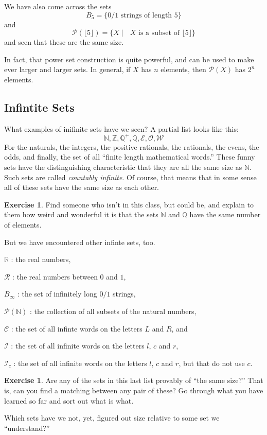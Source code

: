 \documentclass[12pt,letterpaper]{article}
\theoremstyle{definition}
\newtheorem{exercise}[question]{Exercise}
\begin{document}
We have also come across the sets
\[
B_5 = \{ \text{$0/1$ strings of length $5$} \}
\]
and 
\[
\mathcal{P}(\lfloor 5 \rfloor) = \{ X \mid \text{ $X$ is a subset of $\lfloor 5 \rfloor$} \}
\] and seen that these are the same size.

In fact, that power set construction is quite powerful, and can be used to make ever larger and larger sets. In general, if $X$ has $n$ elements, then $\mathcal{P}(X)$ has $2^n$ elements.


\subsection*{Infintite Sets}

What examples of inifinite sets have we seen?
A partial list looks like this:
\[
\mathbb{N}, \mathbb{Z}, \mathbb{Q}^+, \mathbb{Q}, \mathcal{E}, \mathcal{O}, \mathcal{W}
\]
For the naturals, the integers, the positive rationals, the rationals, the evens, the odds, and finally, the set of all ``finite length mathematical words.''
These funny sets have the distinguishing characteristic that they are all the same size as $\mathbb{N}$.
Such sets are called \emph{countably infinite}.
Of course, that means that in some sense all of these sets have the same size as each other.

\begin{exercise}
Find someone who isn't in this class, but could be, and explain to them how weird and wonderful it is that the sets $\mathbb{N}$ and $\mathbb{Q}$ have the same number of elements.
\end{exercise}

But we have encountered other infinte sets, too. 
\begin{compactdesc}
\item[$\mathbb{R}$]: the real numbers,
\item[$\mathcal{R}$]: the real numbers between $0$ and $1$,
\item[$B_{\infty}$]: the set of infinitely long $0/1$ strings,
\item[$\mathcal{P}(\mathbb{N})$]: the collection of all subsets of the natural numbers, 
\item[$\mathcal{C}$]: the set of all infinte words on the letters $L$ and $R$, and
\item[$\mathcal{I}$]: the set of all infinite words on the letters $l$, $c$ and $r$,
\item[$\mathcal{I}_c$]: the set of all infinite words on the letters $l$, $c$ and $r$, but that do not use $c$.
\end{compactdesc}

\begin{exercise}
Are any of the sets in this last list provably of ``the same size?''
That is, can you find a matching between any pair of these?
Go through what you have learned so far and sort out what is what.

Which sets have we not, yet, figured out size relative to some set we ``understand?''
\end{exercise}

\end{document}
